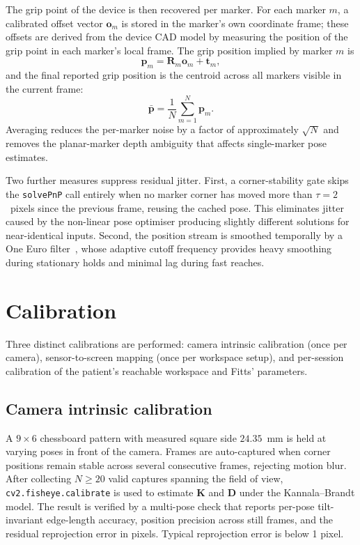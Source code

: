 \documentclass[11pt,a4paper]{article}
\begin{document}
The grip point of the device is then recovered per marker. For each marker $m$, a calibrated offset vector $\mathbf{o}_m$ is stored in the marker's own coordinate frame; these offsets are derived from the device CAD model by measuring the position of the grip point in each marker's local frame. The grip position implied by marker $m$ is
\begin{equation}
    \mathbf{p}_m = \mathbf{R}_m \mathbf{o}_m + \mathbf{t}_m,
\end{equation}
and the final reported grip position is the centroid across all markers visible in the current frame:
\begin{equation}
    \bar{\mathbf{p}} = \frac{1}{N} \sum_{m=1}^{N} \mathbf{p}_m.
\end{equation}
Averaging reduces the per-marker noise by a factor of approximately $\sqrt{N}$ and removes the planar-marker depth ambiguity that affects single-marker pose estimates.

Two further measures suppress residual jitter. First, a corner-stability gate skips the \texttt{solvePnP} call entirely when no marker corner has moved more than $\tau = 2$~pixels since the previous frame, reusing the cached pose. This eliminates jitter caused by the non-linear pose optimiser producing slightly different solutions for near-identical inputs. Second, the position stream is smoothed temporally by a One Euro filter~\cite{casiez2012one}, whose adaptive cutoff frequency provides heavy smoothing during stationary holds and minimal lag during fast reaches.

\section{Calibration}
\label{sec:calibration}

Three distinct calibrations are performed: camera intrinsic calibration (once per camera), sensor-to-screen mapping (once per workspace setup), and per-session calibration of the patient's reachable workspace and Fitts' parameters.

\subsection{Camera intrinsic calibration}

A $9 \times 6$ chessboard pattern with measured square side $24.35$~mm is held at varying poses in front of the camera. Frames are auto-captured when corner positions remain stable across several consecutive frames, rejecting motion blur. After collecting $N \geq 20$ valid captures spanning the field of view, \texttt{cv2.fisheye.calibrate} is used to estimate $\mathbf{K}$ and $\mathbf{D}$ under the Kannala--Brandt model. The result is verified by a multi-pose check that reports per-pose tilt-invariant edge-length accuracy, position precision across still frames, and the residual reprojection error in pixels. Typical reprojection error is below 1 pixel.
\end{document}
